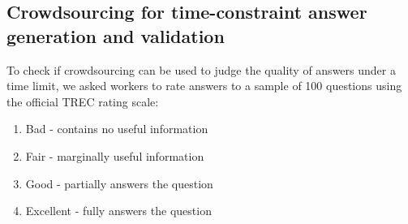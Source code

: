 \subsection{Crowdsourcing for time-constraint answer generation and validation}
\label{section:crowdsourcing:approach:experiments}

To check if crowdsourcing can be used to judge the quality of answers under a time limit, we asked workers to rate answers to a sample of 100 questions using the official TREC rating scale:
\begin{enumerate}
\item Bad - contains no useful information
\item Fair - marginally useful information
\item Good - partially answers the question
\item Excellent - fully answers the question
\end{enumerate}

